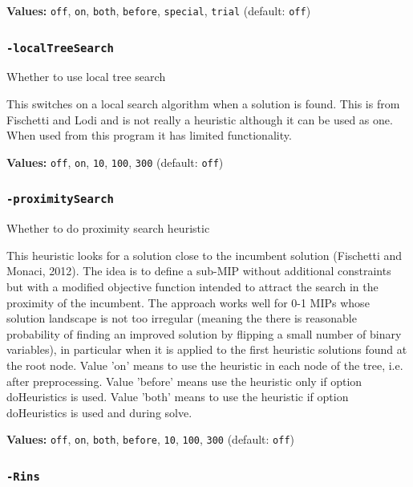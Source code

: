 \documentclass[11pt,a4paper]{article}
\begin{document}
\textbf{Values:} \texttt{off}, \texttt{on}, \texttt{both}, \texttt{before}, \texttt{special}, \texttt{trial} (default: \texttt{off})

\subsubsection*{\texttt{-localTreeSearch}}

Whether to use local tree search

This switches on a local search algorithm when a solution is found.  This is from Fischetti and Lodi and is not really a heuristic although it can be used as one. When used from this program it has limited functionality.

\textbf{Values:} \texttt{off}, \texttt{on}, \texttt{10}, \texttt{100}, \texttt{300} (default: \texttt{off})

\subsubsection*{\texttt{-proximitySearch}}

Whether to do proximity search heuristic

This heuristic looks for a solution close to the incumbent solution (Fischetti and Monaci, 2012). The idea is to define a sub-MIP without additional constraints but with a modified objective function intended to attract the search in the proximity of the incumbent. The approach works well for 0-1 MIPs whose solution landscape is not too irregular (meaning the there is reasonable probability of finding an improved solution by flipping a small number of binary variables), in particular when it is applied to the first heuristic solutions found at the root node. Value 'on' means to use the heuristic in each node of the tree, i.e. after preprocessing. Value 'before' means use the heuristic only if option doHeuristics is used. Value 'both' means to use the heuristic if option doHeuristics is used and during solve.

\textbf{Values:} \texttt{off}, \texttt{on}, \texttt{both}, \texttt{before}, \texttt{10}, \texttt{100}, \texttt{300} (default: \texttt{off})

\subsubsection*{\texttt{-Rins}}
\end{document}
